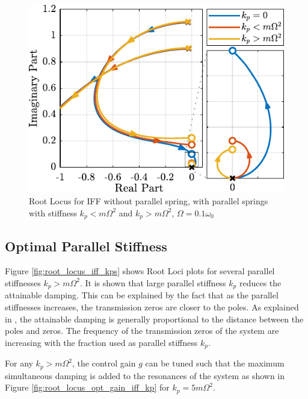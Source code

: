\documentclass{ISMA_USD2020}
\begin{document}
\begin{figure}[htbp]
\centering
\includegraphics[scale=1]{figs/root_locus_iff_kp.pdf}
\caption{\label{fig:root_locus_iff_kp}Root Locus for IFF without parallel spring, with parallel springs with stiffness \(k_p < m \Omega^2\) and \(k_p > m \Omega^2\), \(\Omega = 0.1 \omega_0\)}
\end{figure}

\subsection{Optimal Parallel Stiffness}
\label{sec:orgbfbcf95}
Figure \ref{fig:root_locus_iff_kps} shows Root Loci plots for several parallel stiffnesses \(k_p > m \Omega^2\).
It is shown that large parallel stiffness \(k_p\) reduces the attainable damping.
This can be explained by the fact that as the parallel stiffnesses increases, the transmission zeros are closer to the poles.
As explained in \cite{preumont18_vibrat_contr_activ_struc_fourt_edition}, the attainable damping is generally proportional to the distance between the poles and zeros.
The frequency of the transmission zeros of the system are increasing with the fraction used as parallel stiffness \(k_p\).

For any \(k_p > m \Omega^2\), the control gain \(g\) can be tuned such that the maximum simultaneous damping is added to the resonances of the system as shown in Figure \ref{fig:root_locus_opt_gain_iff_kp} for \(k_p = 5 m \Omega^2\).
\end{document}
